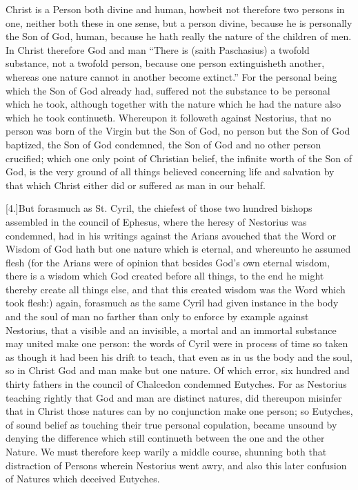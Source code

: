 Christ is a Person both divine and human, howbeit not therefore two persons in one, neither both these in one sense, but a person divine, because he is personally the Son of God, human, because he hath really the nature of the children of men. In Christ therefore God and man “There is (saith Paschasius) a twofold substance, not a twofold person, because one person extinguisheth another, whereas one nature cannot in another become extinct.” For the personal being which the Son of God already had, suffered not the substance  to be personal which he took,
 although together with the nature which he had the nature also which he took continueth. Whereupon it followeth against Nestorius, that no person was born of the Virgin but the Son of God, no person but the Son of God baptized, the Son of God condemned, the Son of God and no other person crucified; which one only point of Christian belief, the infinite worth of the Son of God, is the very ground of all things believed concerning life and salvation by that which Christ either did or suffered as man in our behalf.

[4.]But forasmuch as St. Cyril, the chiefest of those two hundred bishops assembled in the council of Ephesus, where the heresy of Nestorius was condemned, had in his writings against the Arians avouched that the Word or Wisdom of God hath but one nature which is eternal, and whereunto he assumed flesh (for the Arians were of opinion that besides God’s own eternal wisdom, there is a wisdom which God created before all things, to the end he might thereby create all things else, and that this created wisdom was the Word which took flesh:) again, forasmuch as the same Cyril had given instance in the body and the soul of man no farther than only to enforce by example against Nestorius, that a visible and an invisible, a mortal and an immortal substance may united make one person: the words of Cyril were in process of time so taken as though it had been his drift to teach, that even as in us the body and the soul, so in Christ God and man make but one nature. Of which error, six hundred and thirty fathers in the council of Chalcedon condemned Eutyches. For as Nestorius teaching rightly that God and man are distinct natures, did thereupon misinfer that in Christ those natures can by no conjunction make one person; so Eutyches, of sound belief as touching their true personal copulation, became unsound by denying the difference which still continueth between the one and the other Nature. We must therefore keep warily a middle course, shunning both that distraction of Persons wherein Nestorius went awry, and also this later confusion of Natures which deceived Eutyches.



